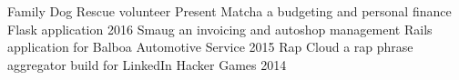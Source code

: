 \begin{cvhonors}
  \cvhonor
    {Family Dog Rescue}
    {volunteer}
    {}
    {Present}
  \cvhonor
    {Matcha}
    {a budgeting and personal finance Flask application}
    {}
    {2016}
  \cvhonor
    {Smaug}
    {an invoicing and autoshop management Rails application for Balboa Automotive Service}
    {}
    {2015}
  \cvhonor
    {Rap Cloud}
    {a rap phrase aggregator build for LinkedIn Hacker Games}
    {}
    {2014}
\end{cvhonors}
